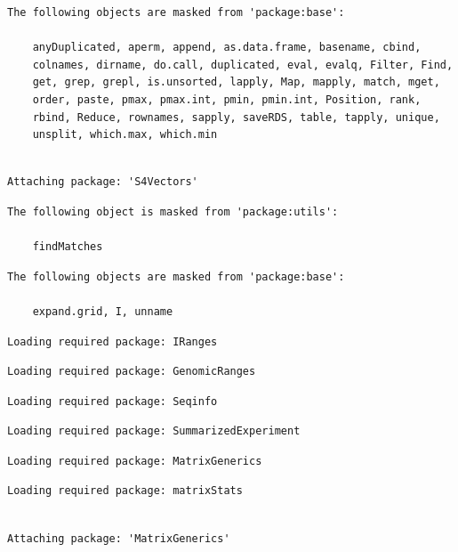 \documentclass[
  letterpaper,
  DIV=11,
  numbers=noendperiod]{scrartcl}
\begin{document}
\begin{verbatim}
The following objects are masked from 'package:base':

    anyDuplicated, aperm, append, as.data.frame, basename, cbind,
    colnames, dirname, do.call, duplicated, eval, evalq, Filter, Find,
    get, grep, grepl, is.unsorted, lapply, Map, mapply, match, mget,
    order, paste, pmax, pmax.int, pmin, pmin.int, Position, rank,
    rbind, Reduce, rownames, sapply, saveRDS, table, tapply, unique,
    unsplit, which.max, which.min
\end{verbatim}

\begin{verbatim}

Attaching package: 'S4Vectors'
\end{verbatim}

\begin{verbatim}
The following object is masked from 'package:utils':

    findMatches
\end{verbatim}

\begin{verbatim}
The following objects are masked from 'package:base':

    expand.grid, I, unname
\end{verbatim}

\begin{verbatim}
Loading required package: IRanges
\end{verbatim}

\begin{verbatim}
Loading required package: GenomicRanges
\end{verbatim}

\begin{verbatim}
Loading required package: Seqinfo
\end{verbatim}

\begin{verbatim}
Loading required package: SummarizedExperiment
\end{verbatim}

\begin{verbatim}
Loading required package: MatrixGenerics
\end{verbatim}

\begin{verbatim}
Loading required package: matrixStats
\end{verbatim}

\begin{verbatim}

Attaching package: 'MatrixGenerics'
\end{verbatim}
\end{document}
